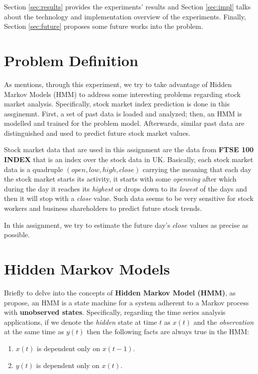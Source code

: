 \documentclass{acm_proc_article-sp}
\begin{document}
Section \ref{sec:results} provides the experiments' results and Section \ref{sec:impl} talks about the technology and
implementation overview of the experiments. Finally, Section \ref{sec:future} proposes some future works into the
problem.

\section{Problem Definition} \label{sec:pdef}
As \cite{erwin:pa4} mentions, through this experiment, we try to take advantage of Hidden Markov Models (HMM) to address
some interesting problems regarding stock market analysis. Specifically, stock market index prediction is done in this
assginemnt. First, a set of past data is loaded and analyzed; then, an HMM is modelled and trained for the problem
model. Afterwards, similar past data are distinguished and used to predict future stock market values.

Stock market data that are used in this assignment are the data from \textbf{FTSE 100 INDEX} that is an index over the
stock data in UK. Basically, each stock market data is a quadruple $(open, low, high, close)$ carrying the meaning that
each day the stock market starts its activity, it starts with some \textit{openning} after which during the day it
reaches its \textit{highest} or drops down to its \textit{lowest} of the days and then it will stop with a
\textit{close} value. Such data seems to be very sensitive for stock workers and business shareholders to predict
future stock trends.

In this assignment, we try to estimate the future day's $close$ values as precise as possible.

\section{Hidden Markov Models} \label{sec:hmm}
Briefly to delve into the concepts of \textbf{Hidden Markov Model (HMM)}, as 
\cite{hassan:phd_ths,hassan:hmm_stock,blunsom:hmm_tut,wiki:hmm} propose, an HMM is a state machine
for a system adherent to a Markov process with \textbf{unobserved states}. Specifically, regarding
the time series analysis applications, if we denote the \textit{hidden} state at time $t$ as $x(t)$
and the \textit{observation} at the same time as $y(t)$ then the following facts are always true in the HMM:
\begin{enumerate}
  \item $x(t)$ is dependent only on $x(t-1)$.
  \item $y(t)$ is dependent only on $x(t)$.
\end{enumerate}
\end{document}
